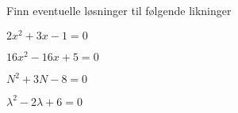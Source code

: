 \documentclass[a4paper,11pt]{article}
\begin{document}
\begin{problem}[7]
    Finn eventuelle løsninger til følgende likninger
    \begin{subproblem}{2}
        \item $2x^2 + 3x - 1 = 0$
        \label{subproblem:MAT-0001-Exercise-03-Problem-1-x-7-a}
        \item $16x^2 - 16x + 5 = 0$
        \label{subproblem:MAT-0001-Exercise-03-Problem-1-x-7-b}
    \end{subproblem}
    \begin{subproblem}[3]{2}
        \item $N^2 + 3N - 8 = 0$
        \label{subproblem:MAT-0001-Exercise-03-Problem-1-x-7-c}
        \item $\lambda^2 - 2\lambda + 6 = 0$
        \label{subproblem:MAT-0001-Exercise-03-Problem-1-x-7-d}
    \end{subproblem}
\end{problem}
\end{document}
